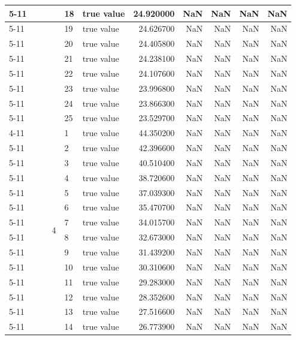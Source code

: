 \begin{tabular}{llllllrrrrr}
\cline{5-11}
 &  &  &  & 18 & true value & 24.920000 & NaN & NaN & NaN & NaN \\
\cline{5-11}
 &  &  &  & 19 & true value & 24.626700 & NaN & NaN & NaN & NaN \\
\cline{5-11}
 &  &  &  & 20 & true value & 24.405800 & NaN & NaN & NaN & NaN \\
\cline{5-11}
 &  &  &  & 21 & true value & 24.238100 & NaN & NaN & NaN & NaN \\
\cline{5-11}
 &  &  &  & 22 & true value & 24.107600 & NaN & NaN & NaN & NaN \\
\cline{5-11}
 &  &  &  & 23 & true value & 23.996800 & NaN & NaN & NaN & NaN \\
\cline{5-11}
 &  &  &  & 24 & true value & 23.866300 & NaN & NaN & NaN & NaN \\
\cline{5-11}
 &  &  &  & 25 & true value & 23.529700 & NaN & NaN & NaN & NaN \\
\cline{4-11} \cline{5-11}
 &  &  & \multirow[t]{25}{*}{4} & 1 & true value & 44.350200 & NaN & NaN & NaN & NaN \\
\cline{5-11}
 &  &  &  & 2 & true value & 42.396600 & NaN & NaN & NaN & NaN \\
\cline{5-11}
 &  &  &  & 3 & true value & 40.510400 & NaN & NaN & NaN & NaN \\
\cline{5-11}
 &  &  &  & 4 & true value & 38.720600 & NaN & NaN & NaN & NaN \\
\cline{5-11}
 &  &  &  & 5 & true value & 37.039300 & NaN & NaN & NaN & NaN \\
\cline{5-11}
 &  &  &  & 6 & true value & 35.470700 & NaN & NaN & NaN & NaN \\
\cline{5-11}
 &  &  &  & 7 & true value & 34.015700 & NaN & NaN & NaN & NaN \\
\cline{5-11}
 &  &  &  & 8 & true value & 32.673000 & NaN & NaN & NaN & NaN \\
\cline{5-11}
 &  &  &  & 9 & true value & 31.439200 & NaN & NaN & NaN & NaN \\
\cline{5-11}
 &  &  &  & 10 & true value & 30.310600 & NaN & NaN & NaN & NaN \\
\cline{5-11}
 &  &  &  & 11 & true value & 29.283000 & NaN & NaN & NaN & NaN \\
\cline{5-11}
 &  &  &  & 12 & true value & 28.352600 & NaN & NaN & NaN & NaN \\
\cline{5-11}
 &  &  &  & 13 & true value & 27.516600 & NaN & NaN & NaN & NaN \\
\cline{5-11}
 &  &  &  & 14 & true value & 26.773900 & NaN & NaN & NaN & NaN \\

\end{tabular}
